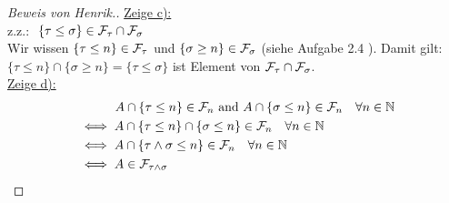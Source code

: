 \documentclass[12pt,a4paper]{article}
\begin{document}
\begin{proof}[Beweis von Henrik.]
\underline{Zeige c):}\\
z.z.: $\ \{\tau \leq \sigma\} \in \mathcal{F}_\tau \cap \mathcal{F}_\sigma$\\
Wir wissen $\{\tau \leq n\} \in \mathcal{F}_\tau$ und  $\{\sigma \geq n\} \in \mathcal{F}_\sigma$ (siehe Aufgabe 2.4 ). Damit gilt: $\{\tau \leq n\} \cap \{\sigma \geq n\} = \{\tau \leq \sigma\} $ ist Element von $\mathcal{F}_\tau \cap \mathcal{F}_\sigma$.\\

\underline{Zeige d):}\\
\begin{align*}
&{} \qquad \quad  A \cap \{\tau \leq n\}\in \mathcal{F}_n \text{ and } A \cap\{\sigma \leq n\}\in \mathcal{F}_n \quad \forall n \in \mathbb{N}\\
&\iff  A \cap \{\tau \leq n\} \cap \{\sigma \leq n\}\in \mathcal{F}_n \quad \forall n \in \mathbb{N} \\
&\iff  A \cap \{\tau \land \sigma \leq n\} \in \mathcal{F}_n \quad \forall n \in \mathbb{N}\\
&\iff A \in \mathcal{F}_{\tau \land \sigma} \\
\end{align*}

\end{proof}
\end{document}
